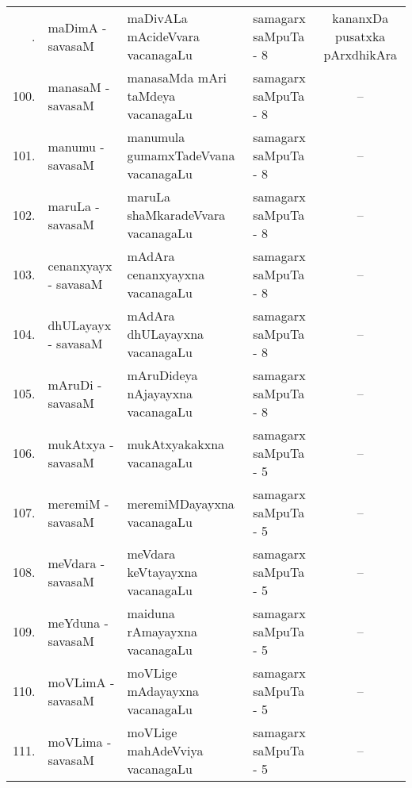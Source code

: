 {\renewcommand{\arraystretch}{1.3}
\begin{longtable}{rl>{\raggedright}p{5.5cm}lc}
\hline
\endfirsthead
\hline
\endhead
\hline
\endfoot
\endlastfoot
99. & maDimA - savasaM &  maDivALa mAcideVvara vacanagaLu & samagarx saMpuTa - 8 & kananxDa pusatxka pArxdhikAra\\
100. & manasaM - savasaM & manasaMda mAri taMdeya vacanagaLu & samagarx saMpuTa - 8 & --\\
101. & manumu - savasaM & manumula gumamxTadeVvana vacanagaLu & samagarx saMpuTa - 8 & --\\
102. & maruLa - savasaM & maruLa shaMkaradeVvara vacanagaLu & samagarx saMpuTa - 8 & --\\
103. & cenanxyayx - savasaM & mAdAra cenanxyayxna vacanagaLu & samagarx saMpuTa - 8 & --\\
104. & dhULayayx - savasaM & mAdAra dhULayayxna vacanagaLu & samagarx saMpuTa - 8 & --\\
105. & mAruDi - savasaM & mAruDideya nAjayayxna vacanagaLu & samagarx saMpuTa - 8 & --\\
106. & mukAtxya - savasaM & mukAtxyakakxna vacanagaLu & samagarx saMpuTa - 5 & --\\
107. & meremiM - savasaM & meremiMDayayxna vacanagaLu & samagarx saMpuTa - 5 & --\\
108. & meVdara - savasaM & meVdara keVtayayxna vacanagaLu & samagarx saMpuTa - 5 & --\\
109. & meYduna - savasaM & maiduna rAmayayxna vacanagaLu & samagarx saMpuTa - 5 & --\\
110. & moVLimA - savasaM & moVLige mAdayayxna vacanagaLu & samagarx saMpuTa - 5 & --\\
111. & moVLima - savasaM & moVLige mahAdeVviya vacanagaLu & samagarx saMpuTa - 5 & --\\
\hline
\end{longtable}}

